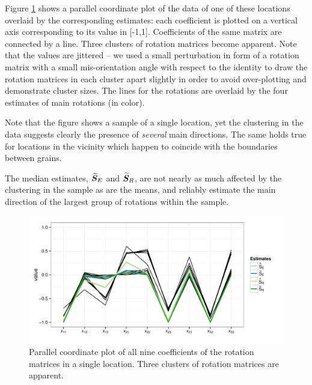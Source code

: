 Figure \ref{fig:pcp} shows a parallel coordinate plot of the data of one of these locations overlaid by the corresponding estimates: each coefficient is plotted on a vertical axis corresponding to its value in [-1,1]. Coefficients of the same matrix are connected by a line. Three clusters of rotation matrices become apparent. Note that the values are jittered -- we used a small perturbation in form of a rotation matrix with a small mis-orientation angle with respect to the identity to draw the rotation matrices in each cluster apart slightly in order to avoid over-plotting and demonstrate cluster sizes. The lines for the rotations are overlaid by the four estimates of main rotations (in color).

 Note that the figure shows a sample of a single location, yet the clustering in the data suggests clearly the presence of \emph{several} main directions. The same holds true for locations in the vicinity which happen to coincide with the boundaries between grains. 

The  median estimates, ${\widetilde{\bm S}_E}$  and ${\widetilde{\bm S}_R}$, are not nearly as much affected by the clustering in the sample as are the means, and reliably estimate the main direction of the largest group of rotations within the sample.


\begin{figure}[htbp] %
   \centering
   \includegraphics[width=.6\textwidth]{images/pcp.pdf} 
   \caption{ \label{fig:pcp}Parallel coordinate plot of all nine coefficients of the rotation matrices in a single location. Three clusters of rotation matrices are apparent.  }
\end{figure}



